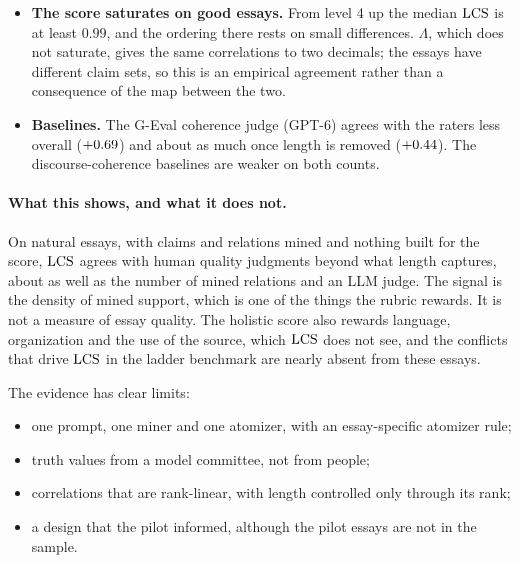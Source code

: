 \begin{itemize}[leftmargin=1.2em,itemsep=1pt,topsep=2pt]
  opposite: after length, the strict world correlated at $\asapPilotParStrict$, against
  $\asapPilotParAsserted$ with every claim true. The atomizer rule, added after that pilot, does
  not explain the difference, since with it the two are $\asapPilotFixParStrict$ and
  $\asapPilotFixParAsserted$. With \asapPilotN{} essays the intervals are wide (the strict world
  with the rule gives
  $\asapPilotFixParStrict$\asapCI{\asapPilotFixParStrictLo}{\asapPilotFixParStrictHi}) and
  overlap those of Table~\ref{tab:asap-corr}; the pilot's ordering of the two worlds did not
  replicate.
\item \textbf{The score saturates on good essays.} From level 4 up the median $\mathrm{LCS}$ is at least
  $0.99$, and the ordering there rests on small differences. $\Lambda$, which does not saturate,
  gives the same correlations to two decimals; the essays have different claim sets, so this is
  an empirical agreement rather than a consequence of the map between the two.
\item \textbf{Baselines.} The G-Eval coherence judge (GPT-6) agrees with the raters less overall
  ($\asapRhoJudgeGevalGptSixSol$) and about as much once length is removed
  ($\asapParJudgeGevalGptSixSol$). The discourse-coherence baselines are weaker on both counts.
\end{itemize}

\paragraph{What this shows, and what it does not.} On natural essays, with claims and relations
mined and nothing built for the score, $\mathrm{LCS}$ agrees with human quality judgments beyond what length captures, about as well as the
number of mined relations and an LLM judge. The signal is the density of mined support, which is one
of the things the rubric rewards. It is not a measure of essay quality. The holistic score
also rewards language, organization and the use of the source, which $\mathrm{LCS}$ does not see, and the
conflicts that drive $\mathrm{LCS}$ in the ladder benchmark are nearly absent from these essays.

The evidence has clear limits:
\begin{itemize}[leftmargin=1.2em,itemsep=1pt,topsep=2pt]
\item one prompt, one miner and one atomizer, with an essay-specific atomizer rule;
\item truth values from a model committee, not from people;
\item correlations that are rank-linear, with length controlled only through its rank;
\item a design that the pilot informed, although the pilot essays are not in the sample.
\end{itemize}
